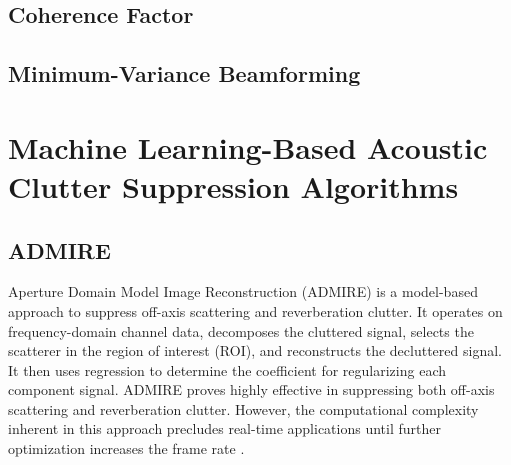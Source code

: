 %
%

\subsection{Coherence Factor}


\subsection{Minimum-Variance Beamforming}


\section{Machine Learning-Based Acoustic Clutter Suppression Algorithms}

\subsection{ADMIRE}

Aperture Domain Model Image Reconstruction (ADMIRE) is a model-based approach to suppress off-axis scattering and reverberation clutter. It operates on frequency-domain channel data, decomposes the cluttered signal, selects the scatterer in the region of interest (ROI), and reconstructs the decluttered signal. It then uses regression to determine the coefficient for regularizing each component signal. ADMIRE proves highly effective in suppressing both off-axis scattering and reverberation clutter. However, the computational complexity inherent in this approach precludes real-time applications until further optimization increases the frame rate \cite{dei_2019, admire2015}.

